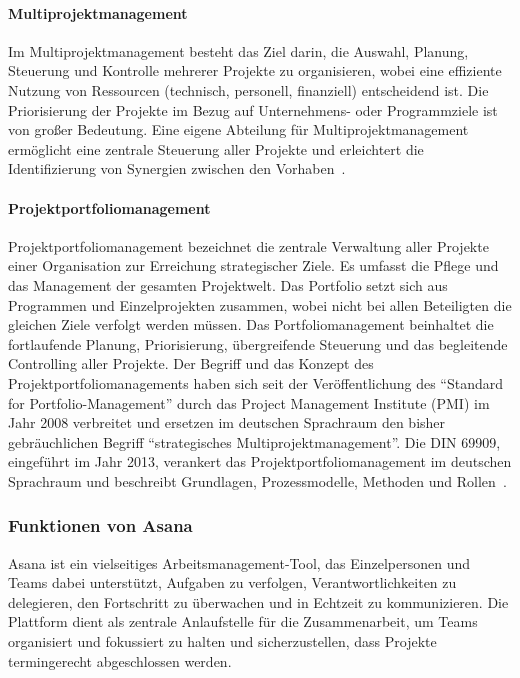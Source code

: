 \documentclass[sigconf, nonacm]{acmart}
\begin{document}
\paragraph{Multiprojektmanagement}
Im Multiprojektmanagement besteht das Ziel darin, die Auswahl, Planung, Steuerung und Kontrolle mehrerer Projekte zu organisieren, wobei eine effiziente Nutzung von Ressourcen (technisch, personell, finanziell) entscheidend ist. Die Priorisierung der Projekte im Bezug auf Unternehmens- oder Programmziele ist von großer Bedeutung. Eine eigene Abteilung für Multiprojektmanagement ermöglicht eine zentrale Steuerung aller Projekte und erleichtert die Identifizierung von Synergien zwischen den Vorhaben~\cite{venzmer_multiprojektmanagement-software_2020}.

\paragraph{Projektportfoliomanagement }
Projektportfoliomanagement bezeichnet die zentrale Verwaltung aller Projekte einer Organisation zur Erreichung strategischer Ziele. Es umfasst die Pflege und das Management der gesamten Projektwelt. Das Portfolio setzt sich aus Programmen und Einzelprojekten zusammen, wobei nicht bei allen Beteiligten die gleichen Ziele verfolgt werden müssen. Das Portfoliomanagement beinhaltet die fortlaufende Planung, Priorisierung, übergreifende Steuerung und das begleitende Controlling aller Projekte. Der Begriff und das Konzept des Projektportfoliomanagements haben sich seit der Veröffentlichung des \enquote{Standard for Portfolio-Management} durch das Project Management Institute (PMI) im Jahr 2008 verbreitet und ersetzen im deutschen Sprachraum den bisher gebräuchlichen Begriff \enquote{strategisches Multiprojektmanagement}. Die DIN 69909, eingeführt im Jahr 2013, verankert das Projektportfoliomanagement im deutschen Sprachraum und beschreibt Grundlagen, Prozessmodelle, Methoden und Rollen~\cite{gmbh_detailseite_nodate}.

\subsubsection{Funktionen von Asana}
Asana ist ein vielseitiges Arbeitsmanagement-Tool, das Einzelpersonen und Teams dabei unterstützt, Aufgaben zu verfolgen, Verantwortlichkeiten zu delegieren, den Fortschritt zu überwachen und in Echtzeit zu kommunizieren. Die Plattform dient als zentrale Anlaufstelle für die Zusammenarbeit, um Teams organisiert und fokussiert zu halten und sicherzustellen, dass Projekte termingerecht abgeschlossen werden.
\\
\end{document}
